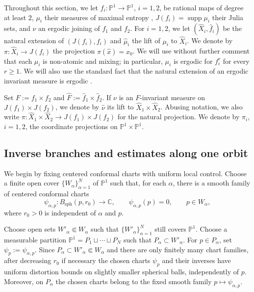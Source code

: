\documentclass[11pt]{amsart}
\numberwithin{equation}{section}
\theoremstyle{plain}
\theoremstyle{definition}
\theoremstyle{remark}
\begin{document}
\smallskip

Throughout this section, we let $f_i\colon \mathbb P^1\to\mathbb P^1$,
$i=1,2$, be rational maps of degree at least $2$, 
$\mu_i$ 
their measures of maximal entropy \cite{Lyubich83,FLM83},
$J(f_i)=\operatorname{supp} \mu_i$ their Julia sets,
and $\nu$  an ergodic
joining of $f_1$ and $f_2$. 
For $i=1,2$, we let $(\hat X_i,\hat f_i)$ be the natural extension of
$(J(f_i),f_i)$ and 
$\hat\mu_i$
the lift of $\mu_i$ to
$\hat X_i$. We denote by
$\pi\colon\hat X_i\to J(f_i)$ the projection
$\pi(\hat x)=x_0$.
We will use without further comment that each
$\mu_i$ is non-atomic and mixing; 
in particular, $\mu_i$ is ergodic for $f_i^r$ for every
$r\geq1$. We will also use the standard fact that the natural extension
of an ergodic invariant measure is ergodic \cite{CFS12}.

Set
$F:=f_1\times f_2$ and
$\hat F:=\hat f_1\times\hat f_2$.
If $\nu$ is an $F$-invariant measure on
$J(f_1)\times J(f_2)$, we denote by $\hat\nu$ its lift to
$\hat X_1\times\hat X_2$. Abusing notation, we also write
$\pi\colon\hat X_1\times\hat X_2\to J(f_1)\times J(f_2)$
for the natural projection. We denote by $\pi_i$, $i=1,2$, the
coordinate projections on $\mathbb P^1\times\mathbb P^1$.


\subsection{Inverse branches and estimates along one orbit}
\label{subsec:inverse-branches}
We begin by fixing centered conformal charts with uniform local
control. Choose a finite open cover
$\{W_\alpha\}_{\alpha=1}^N$ of $\mathbb P^1$ such that, for each
$\alpha$, there is a smooth family of centered conformal charts
$$
\psi_{\alpha,p}\colon
B_{\mathrm{sph}}(p,r_0)\to\mathbb C,
\qquad
\psi_{\alpha,p}(p)=0,
\qquad
p\in W_\alpha,
$$
where $r_0>0$ is independent of $\alpha$ and $p$.

Choose open sets $W'_\alpha\Subset W_\alpha$
such that $\{W'_\alpha\}_{\alpha=1}^N$ still covers
$\mathbb P^1$.
Choose a measurable partition
$
\mathbb P^1=P_1\sqcup\cdots\sqcup P_N
$
such that
$
P_\alpha\subset W'_\alpha.
$
For $p\in P_\alpha$, set
$\psi_p:=\psi_{\alpha,p}$.
Since
$P_\alpha\subset W'_\alpha\Subset W_\alpha$ and there are only
finitely many chart families, after decreasing $r_0$ if necessary
the chosen charts $\psi_p$ and their inverses have uniform
distortion bounds on slightly smaller spherical balls, independently
of $p$.
Moreover,
on $P_\alpha$ the chosen
charts belong to the fixed smooth family
$p\mapsto\psi_{\alpha,p}$.
\end{document}
